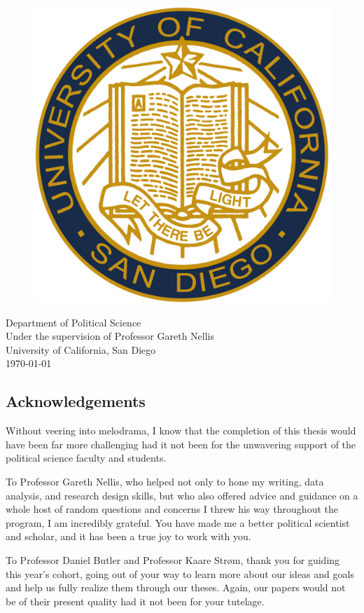 \documentclass[12pt]{article}
\begin{document}
\begin{titlepage}
\vfill
\begin{figure}[H]
\begin{center}
\includegraphics[width = .2\textwidth]{ucsd_seal.png}
\end{center}
\end{figure}

\begin{center}	
Department of Political Science\\
Under the supervision of Professor Gareth Nellis\\
University of California, San Diego\\
\today
\end{center}

\end{titlepage}


\tableofcontents

\listoffigures

\listoftables

\pagebreak


\begin{center}\section*{Acknowledgements}\end{center}
Without veering into melodrama, I know that the completion of this thesis would have been far more challenging had it not been for the unwavering support of the political science faculty and students.

To Professor Gareth Nellis, who helped not only to hone my writing, data analysis, and research design skills, but who also offered advice and guidance on a whole host of random questions and concerns I threw his way throughout the program, I am incredibly grateful. You have made me a better political scientist and scholar, and it has been a true joy to work with you.   

To Professor Daniel Butler and Professor Kaare Strøm, thank you for guiding this year's cohort, going out of your way to learn more about our ideas and goals and help us fully realize them through our theses. Again, our papers would not be of their present quality had it not been for your tutelage.
\end{document}
